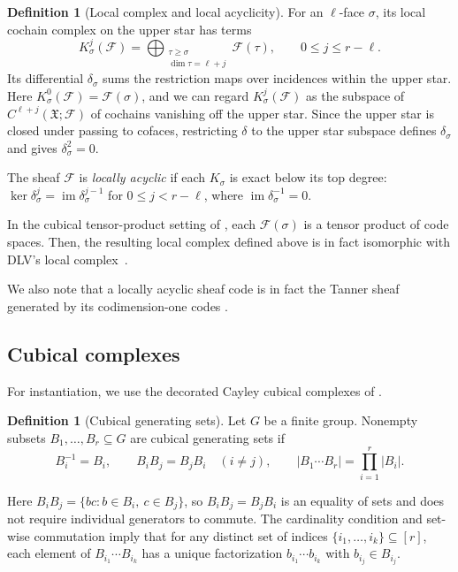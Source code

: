 \documentclass[11pt,letterpaper]{article}
\renewcommand{\le}{\leqslant}
\renewcommand{\ge}{\geqslant}
\theoremstyle{definition}
\newtheorem{definition}[theorem]{Definition}
\theoremstyle{remark}
\newcommand{\cF}{\mathcal F}
\newcommand{\X}{\mathfrak{X}}
\newcommand{\im}{\operatorname{im}}
\begin{document}
\begin{definition}[Local complex and local acyclicity]
\label{def:upper-star-complex}\label{def:local-acyclicity}
For an $\ell$-face $\sigma$, its local cochain complex on the
upper star has terms
\begin{equation}
 K_\sigma^j(\cF)=
 \bigoplus_{\substack{\tau\ge\sigma\\\dim\tau=\ell+j}}
 \cF(\tau),\qquad 0\le j\le r-\ell.
 \label{eq:upper-star-complex}
\end{equation}
Its differential $\delta_\sigma$ sums the restriction
maps over incidences within the upper star.
{Here $K_\sigma^0(\cF)=\cF(\sigma)$, and we can regard $K_\sigma^j(\cF)$ as
the subspace of $C^{\ell+j}(\X;\cF)$ of cochains vanishing off the
upper star. Since the upper star is
closed under passing to cofaces, restricting $\delta$ to the upper star subspace defines $\delta_\sigma$ and gives $\delta_\sigma^2=0$.}

The sheaf $\cF$ is \emph{locally acyclic} if each $K_\sigma$ is exact
below its top degree: $\ker\delta_\sigma^j=\im\delta_\sigma^{j-1}$
for $0\le j<r-\ell$, where $\im\delta_\sigma^{-1}=0$.
\end{definition}
In the cubical tensor-product setting of \cite{DinurLinVidick2024}, each $\cF(\sigma)$ is a
tensor product of code spaces. Then, the resulting local complex defined above is in fact isomorphic with DLV's local
complex~\cite[Section~5.1 and Lemma~5.2]{DinurLinVidick2024}.

We also note that a locally acyclic sheaf code is in fact the Tanner
sheaf generated by its codimension-one codes
\cite[Theorem~3.3 and Corollary~3.7]{LiEtAl2025}.

\subsection{Cubical complexes}
\label{sec:cubical-complex}\label{sec:geometry-construction}
For instantiation, we use the decorated Cayley cubical complexes of
\cite[Definitions~3.1--3.2]{HLMRZ2025}.

\begin{definition}[Cubical generating sets]
\label{def:cubical-generators}
Let $G$ be a finite group. Nonempty subsets $B_1,\ldots,B_r\subseteq G$
are cubical generating sets if
\begin{equation}
 B_i^{-1}=B_i,\qquad B_iB_j=B_jB_i\quad(i\ne j),\qquad
 |B_1\cdots B_r|=\prod_{i=1}^r|B_i|.
 \label{eq:cubical-generators}
\end{equation}
\end{definition}
{Here $B_iB_j=\{bc:b\in B_i,\ c\in B_j\}$, so
$B_iB_j=B_jB_i$ is an equality of sets and does not require
individual generators to commute.}
The cardinality condition and set-wise commutation imply that for any distinct set of indices $\{i_1,\dots,i_k\} \subseteq [r]$, each element of $B_{i_1}\cdots B_{i_k}$ has a unique factorization $b_{i_1}\cdots b_{i_k}$ with $b_{i_j}\in B_{i_j}$.
\end{document}
